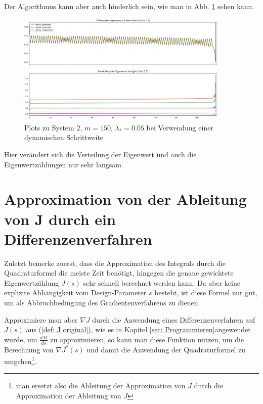 \documentclass[a4paper,12pt]{report}
\newcommand{\1}{\mathds{1}}
\theoremstyle{plain} %
\theoremstyle{definition} %
\theoremstyle{remark}
\begin{document}
            Der Algorithmus kann aber auch hinderlich sein, wie man in Abb. \ref{fig: Plot_2_150_0.05_dynamischSchritt} sehen kann.
            \begin{figure}[h!t]
                  \centering
                  \includegraphics[width=0.9\textwidth, keepaspectratio]{./dynamischSchritt/Plot_2_150_0.05.png}
                  \caption[Plots zu System 2, $m=150$, $\lambda_*=0.05$, dynamische Schrittweite]{Plots zu System 2, $m=150$, $\lambda_*=0.05$ bei Verwendung einer dynamischen Schrittweite}
                  \label{fig: Plot_2_150_0.05_dynamischSchritt}
            \end{figure}

            Hier verändert sich die Verteilung der Eigenwert und auch die Eigenwertzählungen nur sehr langsam.

      \section{Approximation von der Ableitung von J durch ein Differenzenverfahren}

            Zuletzt bemerke zuerst, dass die Approximation des Integrals durch die Quadraturformel die meiste Zeit benötigt, hingegen die genaue gewichtete Eigenwertzählung $J(s)$ sehr schnell berechnet werden kann.
            Da aber keine explizite Abhängigkeit vom Design-Parameter $s$ besteht, ist diese Formel nur gut, um als Abbruchbedingung des Gradientenverfahrens zu dienen.

            Approximiere man aber $\nabla J$ durch die Anwendung eines Differenzenverfahren auf $J(s)$ aus (\ref{def: J original}), wie es in Kapitel \ref{sec: Programmieren}angewendet wurde, um $\frac {dM}{ds}$ zu approximieren,
            so kann man diese Funktion nutzen, um die Berechnung von $\nabla J^*(s)$ und damit die Anwendung der Quadraturformel zu umgehen\footnote{man ersetzt also die Ableitung der Approximation von $J$ durch die Approximation der Ableitung von $J$}.
\end{document}
